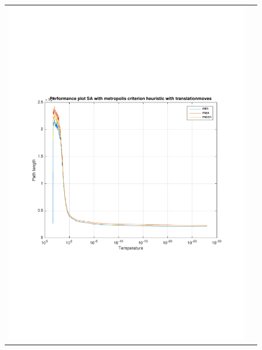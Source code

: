 \documentclass[a4paper, 11pt]{scrartcl}
\begin{document}
\begin{figure}[!ht]
\begin{tabular}{cc}
    \includegraphics[scale=0.4, trim={3cm 6cm 1cm 6cm}]{../figures/perfPlot_SA_metropolis_translation.pdf} \\ 

\end{tabular}
\end{figure}
\end{document}
